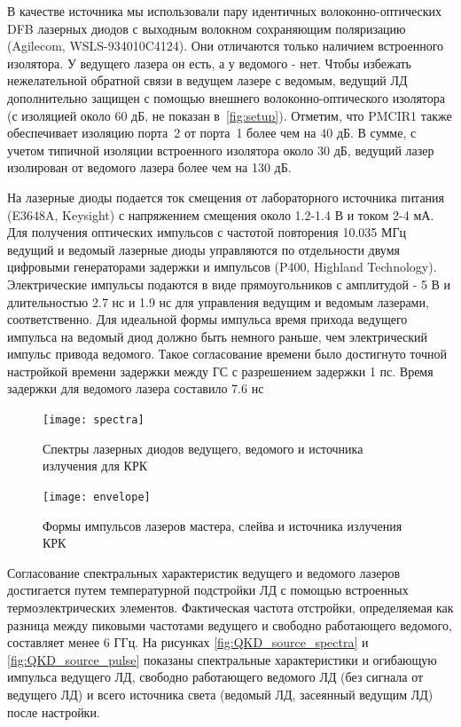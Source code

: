 В качестве источника мы использовали пару идентичных волоконно-оптических DFB лазерных диодов с выходным волокном сохраняющим поляризацию (Agilecom, WSLS-934010C4124). Они отличаются только наличием встроенного изолятора. У ведущего лазера он есть, а у ведомого - нет. Чтобы избежать нежелательной обратной связи в ведущем лазере с ведомым, ведущий ЛД дополнительно защищен с помощью внешнего волоконно-оптического изолятора (с изоляцией около 60 дБ, не показан в~\cref{fig:setup}). Отметим, что PMCIR1 также обеспечивает изоляцию порта~2 от порта~1 более чем на 40 дБ. В сумме, с учетом типичной изоляции встроенного изолятора около 30 дБ, ведущий лазер изолирован от ведомого лазера более чем на 130 дБ.
 
На лазерные диоды подается ток смещения от лабораторного источника питания (E3648A, Keysight) с напряжением смещения около 1.2-1.4 В и током 2-4 мА. Для получения оптических импульсов с частотой повторения 10.035 МГц ведущий и ведомый лазерные диоды управляются по отдельности двумя цифровыми генераторами задержки и импульсов (P400, Highland Technology). Электрические импульсы подаются в виде прямоугольников с амплитудой - 5 В и длительностью 2.7 нс и 1.9 нс  для управления ведущим и ведомым лазерами, соответственно. Для идеальной формы импульса время прихода ведущего импульса на ведомый диод должно быть немного раньше, чем электрический импульс привода ведомого. Такое согласование времени было достигнуто точной настройкой времени задержки между ГС с разрешением задержки 1 пс. Время задержки для ведомого лазера составило 7.6 нс
\begin{figure}
	\centering
	\texttt{[image: spectra]}
	\caption{Спектры лазерных диодов ведущего, ведомого и источника излучения для КРК}
\end{figure}\label{fig:QKD_source_spectra}

\begin{figure}
	\centering
	\texttt{[image: envelope]}
	\caption{Формы импульсов лазеров мастера, слейва и источника излучения КРК}
\end{figure}\label{fig:QKD_source_pulse}

Согласование спектральных характеристик ведущего и ведомого лазеров достигается путем температурной подстройки ЛД с помощью встроенных термоэлектрических элементов. Фактическая частота отстройки, определяемая как разница между пиковыми частотами ведущего и свободно работающего ведомого, составляет менее 6 ГГц. На рисунках \ref{fig:QKD_source_spectra} и \ref{fig:QKD_source_pulse} показаны спектральные характеристики и огибающую импульса ведущего ЛД, свободно работающего ведомого ЛД (без сигнала от ведущего ЛД) и всего источника света (ведомый ЛД, засеянный ведущим ЛД) после настройки. 


